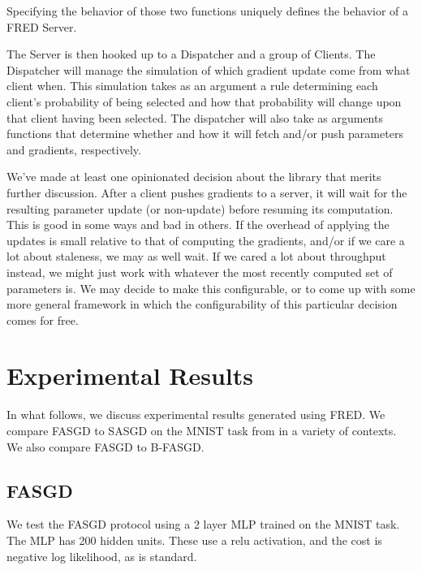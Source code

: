 \documentclass{article} %
\begin{document}
Specifying the behavior of those two functions uniquely defines the behavior of a
FRED Server.

The Server is then hooked up to a Dispatcher and a group of Clients.
The Dispatcher will manage the simulation of which gradient update come from what client when.
This simulation takes as an argument a rule determining each client's probability of being selected
and how that probability will change upon that client having been selected.
The dispatcher will also take as arguments functions that determine whether and how it will fetch and/or push
parameters and gradients, respectively.

We've made at least one opinionated decision about the library that merits further discussion.
After a client pushes gradients to a server, it will wait for the resulting parameter update (or non-update) before
resuming its computation. This is good in some ways and bad in others. If the overhead of applying the updates is
small relative to that of computing the gradients, and/or if we care a lot about staleness, we may as well wait.
If we cared a lot about throughput instead, we might just work with whatever the most recently computed set of parameters is.
We may decide to make this configurable, or to come up with some more general framework in which the configurability
of this particular decision comes for free.

\vspace{-0.1mm}

\section{Experimental Results}
\label{expts}

In what follows, we discuss experimental results generated using FRED.
We compare FASGD to SASGD on the MNIST task from \cite{MNIST} in a variety of contexts.
We also compare FASGD to B-FASGD.

\subsection{FASGD}

We test the FASGD protocol using a 2 layer MLP trained on the MNIST task.
The MLP has 200 hidden units.
These use a relu activation, and the cost is negative log likelihood,
as is standard.
\end{document}

